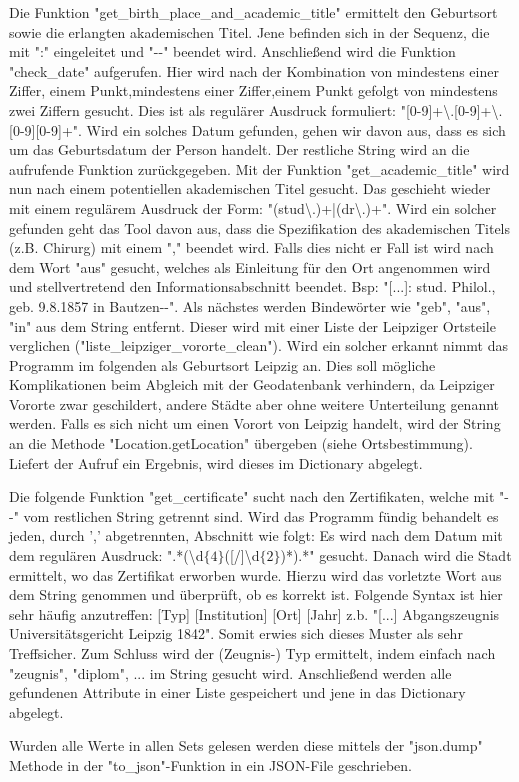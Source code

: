Die Funktion "{}get\_birth\_place\_and\_academic\_title"{} ermittelt den Geburtsort sowie die erlangten akademischen Titel. Jene befinden sich in der Sequenz, die mit "{}:"{} eingeleitet und "{}-{}-"{} beendet wird. Anschließend wird die Funktion "{}check\_date"{} aufgerufen. Hier wird nach der Kombination von mindestens einer Ziffer, einem Punkt,mindestens einer Ziffer,einem Punkt gefolgt von mindestens zwei Ziffern gesucht. Dies ist als regulärer Ausdruck formuliert: "{}[0-9]+\textbackslash.[0-9]+\textbackslash.[0-9][0-9]+"{}. Wird ein solches Datum gefunden, gehen wir davon aus, dass es sich um das Geburtsdatum der Person handelt. Der restliche String wird an die aufrufende Funktion zurückgegeben.
Mit der Funktion "{}get\_academic\_title"{} wird nun nach einem potentiellen akademischen Titel gesucht. Das geschieht wieder mit einem regulärem Ausdruck der Form: "{}(stud\textbackslash.)+|(dr\textbackslash.)+"{}. Wird ein solcher gefunden geht das Tool davon aus, dass die Spezifikation des akademischen Titels (z.B. Chirurg) mit einem "{},"{} beendet wird. Falls dies nicht er Fall ist wird nach dem Wort "{}aus"{} gesucht, welches als Einleitung für den Ort angenommen wird und stellvertretend den Informationsabschnitt beendet. Bsp: "{}[...]: stud. Philol., geb. 9.8.1857 in Bautzen-{}-"{}.
Als nächstes werden Bindewörter wie "{}geb"{}, "{}aus"{}, "{}in"{} aus dem String entfernt. Dieser wird mit einer Liste der Leipziger Ortsteile verglichen ("{}liste\_leipziger\_vororte\_clean"{}). Wird ein solcher erkannt nimmt das Programm im folgenden als Geburtsort Leipzig an. Dies soll mögliche Komplikationen beim Abgleich mit der Geodatenbank verhindern, da Leipziger Vororte zwar geschildert, andere Städte aber ohne weitere Unterteilung genannt werden. Falls es sich nicht um einen Vorort von Leipzig handelt, wird der String an die Methode "{}Location.getLocation"{} übergeben (siehe Ortsbestimmung). Liefert der Aufruf ein Ergebnis, wird dieses im Dictionary abgelegt.

Die folgende Funktion "{}get\_certificate"{} sucht nach den Zertifikaten, welche mit "{}-{}-"{} vom restlichen String getrennt sind. Wird das Programm fündig behandelt es jeden, durch '{},'{} abgetrennten, Abschnitt wie folgt:
Es wird nach dem Datum mit dem regulären Ausdruck: "{}.*(\textbackslash{}d$\{4\}$([/]\textbackslash{}d$\{2\}$)*).*"{} gesucht. Danach wird die Stadt ermittelt, wo das Zertifikat erworben wurde. Hierzu wird das vorletzte Wort aus dem String genommen und überprüft, ob es korrekt ist. Folgende Syntax ist hier sehr häufig anzutreffen: [Typ] [Institution] [Ort] [Jahr] z.b. "{}[...] Abgangszeugnis Universitätsgericht Leipzig 1842"{}. Somit erwies sich dieses Muster als sehr Treffsicher. Zum Schluss wird der (Zeugnis-) Typ ermittelt, indem einfach nach "{}zeugnis"{}, "{}diplom"{}, ... im String gesucht wird. Anschließend werden alle gefundenen Attribute in einer Liste gespeichert und jene in das Dictionary abgelegt.

Wurden alle Werte in allen Sets gelesen werden diese mittels der "{}json.dump"{} Methode in der "{}to\_json"{}-Funktion in ein JSON-File geschrieben.
